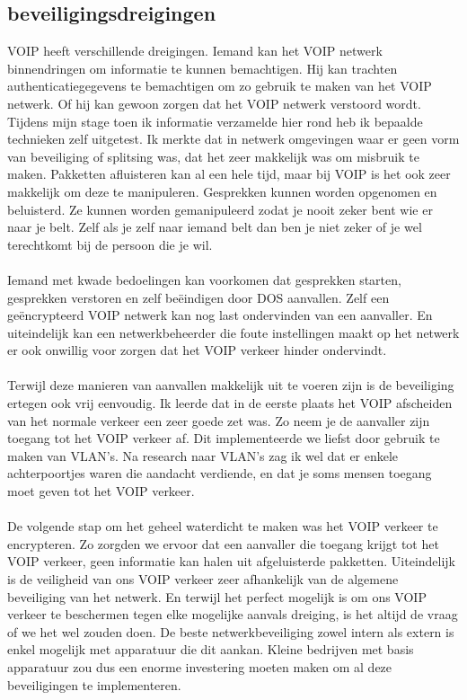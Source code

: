 \documentclass[pdftex,a4paper,12pt,twoside]{report}
\begin{document}
\subsection{beveiligingsdreigingen}
VOIP heeft verschillende dreigingen. Iemand kan het VOIP netwerk binnendringen om informatie te kunnen bemachtigen. Hij kan trachten authenticatiegegevens te bemachtigen om zo gebruik te maken van het VOIP netwerk. Of hij kan gewoon zorgen dat het VOIP netwerk verstoord wordt. Tijdens mijn stage toen ik informatie verzamelde hier rond heb ik bepaalde technieken zelf uitgetest. Ik merkte dat in netwerk omgevingen waar er geen vorm van beveiliging of splitsing was, dat het zeer makkelijk was om misbruik te maken. Pakketten afluisteren kan al een hele tijd, maar bij VOIP is het ook zeer makkelijk om deze te manipuleren. Gesprekken kunnen worden opgenomen en beluisterd. Ze kunnen worden gemanipuleerd zodat je nooit zeker bent wie er naar je belt. Zelf als je zelf naar iemand belt dan ben je niet zeker of je wel terechtkomt bij de persoon die je wil. 
\\ \\
Iemand met kwade bedoelingen kan voorkomen dat gesprekken starten, gesprekken verstoren en zelf beëindigen door DOS aanvallen. Zelf een geëncrypteerd VOIP netwerk kan nog last ondervinden van een aanvaller. En uiteindelijk kan een netwerkbeheerder die foute instellingen maakt op het netwerk er ook onwillig voor zorgen dat het VOIP verkeer hinder ondervindt.
\\ \\
Terwijl deze manieren van aanvallen makkelijk uit te voeren zijn is de beveiliging ertegen ook vrij eenvoudig. Ik leerde dat in de eerste plaats het VOIP afscheiden van het normale verkeer een zeer goede zet was. Zo neem je de aanvaller zijn toegang tot het VOIP verkeer af. Dit implementeerde we liefst door gebruik te maken van VLAN's. Na research naar VLAN's zag ik wel dat er enkele achterpoortjes waren die aandacht verdiende, en dat je soms mensen toegang moet geven tot het VOIP verkeer. 
\\ \\
De volgende stap om het geheel waterdicht te maken was het VOIP verkeer te encrypteren. Zo zorgden we ervoor dat een aanvaller die toegang krijgt tot het VOIP verkeer, geen informatie kan halen uit afgeluisterde pakketten. 
\newpage
Uiteindelijk is de veiligheid van ons VOIP verkeer zeer afhankelijk van de algemene beveiliging van het netwerk. En terwijl het perfect mogelijk is om ons VOIP verkeer te beschermen tegen elke mogelijke aanvals dreiging, is het altijd de vraag of we het wel zouden doen. De beste netwerkbeveiliging zowel intern als extern is enkel mogelijk met apparatuur die dit aankan. Kleine bedrijven met basis apparatuur zou dus een enorme investering moeten maken om al deze beveiligingen te implementeren.\\
\end{document}
